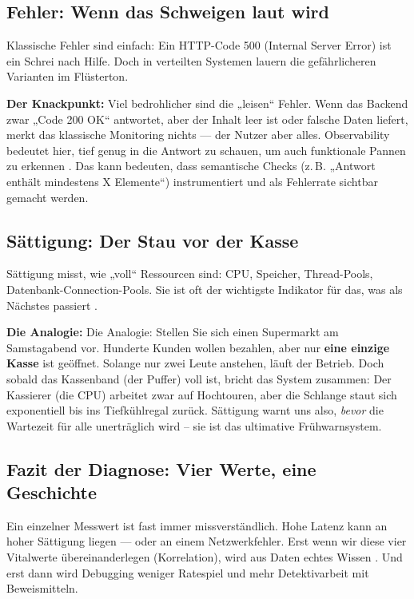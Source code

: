 \subsection{Fehler: Wenn das Schweigen laut wird}

Klassische Fehler sind einfach: Ein HTTP-Code 500 (Internal Server Error) ist ein Schrei nach Hilfe. Doch in verteilten Systemen lauern die gefährlicheren Varianten im Flüsterton.

\textbf{Der Knackpunkt:} Viel bedrohlicher sind die „leisen“ Fehler. Wenn das Backend zwar „Code 200 OK“ antwortet, aber der Inhalt leer ist oder falsche Daten liefert, merkt das klassische Monitoring nichts --- der Nutzer aber alles. Observability bedeutet hier, tief genug in die Antwort zu schauen, um auch funktionale Pannen zu erkennen \cite{abieba2025advanced}. Das kann bedeuten, dass semantische Checks (z.\,B. „Antwort enthält mindestens X Elemente“) instrumentiert und als Fehlerrate sichtbar gemacht werden.

\subsection{Sättigung: Der Stau vor der Kasse}

Sättigung misst, wie „voll“ Ressourcen sind: CPU, Speicher, Thread-Pools, Datenbank-Connection-Pools. Sie ist oft der wichtigste Indikator für das, was als Nächstes passiert \cite{ewaschukMonitoringDistributedSystems}.

\textbf{Die Analogie:} Die Analogie: Stellen Sie sich einen Supermarkt am Samstagabend vor. Hunderte Kunden wollen bezahlen, aber nur \textbf{eine einzige Kasse} ist geöffnet. Solange nur zwei Leute anstehen, läuft der Betrieb. Doch sobald das Kassenband (der Puffer) voll ist, bricht das System zusammen: Der Kassierer (die CPU) arbeitet zwar auf Hochtouren, aber die Schlange staut sich exponentiell bis ins Tiefkühlregal zurück. Sättigung warnt uns also, \textit{bevor} die Wartezeit für alle unerträglich wird -- sie ist das ultimative Frühwarnsystem.

\subsection{Fazit der Diagnose: Vier Werte, eine Geschichte}

Ein einzelner Messwert ist fast immer missverständlich. Hohe Latenz kann an hoher Sättigung liegen --- oder an einem Netzwerkfehler. Erst wenn wir diese vier Vitalwerte übereinanderlegen (Korrelation), wird aus Daten echtes Wissen \cite{ewaschukMonitoringDistributedSystems}. Und erst dann wird Debugging weniger Ratespiel und mehr Detektivarbeit mit Beweismitteln.

